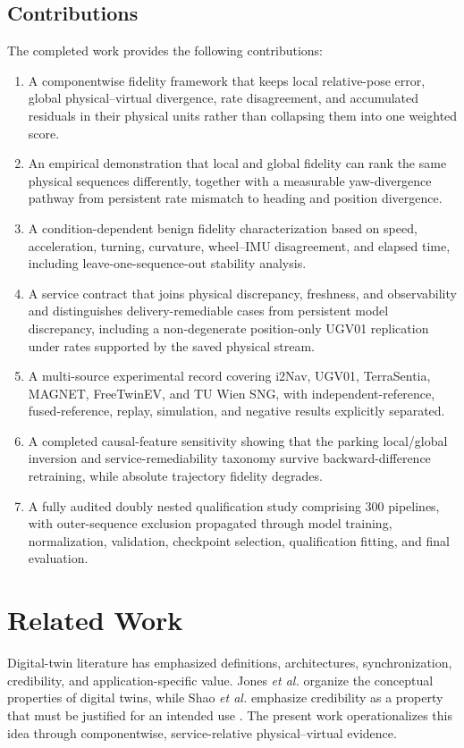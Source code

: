 \documentclass[journal,onecolumn]{IEEEtran}
\begin{document}
\subsection{Contributions}
The completed work provides the following contributions:
\begin{enumerate}
\item A componentwise fidelity framework that keeps local relative-pose error, global physical--virtual divergence, rate disagreement, and accumulated residuals in their physical units rather than collapsing them into one weighted score.
\item An empirical demonstration that local and global fidelity can rank the same physical sequences differently, together with a measurable yaw-divergence pathway from persistent rate mismatch to heading and position divergence.
\item A condition-dependent benign fidelity characterization based on speed, acceleration, turning, curvature, wheel--IMU disagreement, and elapsed time, including leave-one-sequence-out stability analysis.
\item A service contract that joins physical discrepancy, freshness, and observability and distinguishes delivery-remediable cases from persistent model discrepancy, including a non-degenerate position-only UGV01 replication under rates supported by the saved physical stream.
\item A multi-source experimental record covering i2Nav, UGV01, TerraSentia, MAGNET, FreeTwinEV, and TU Wien SNG, with independent-reference, fused-reference, replay, simulation, and negative results explicitly separated.
\item A completed causal-feature sensitivity showing that the parking local/global inversion and service-remediability taxonomy survive backward-difference retraining, while absolute trajectory fidelity degrades.
\item A fully audited doubly nested qualification study comprising 300 pipelines, with outer-sequence exclusion propagated through model training, normalization, validation, checkpoint selection, qualification fitting, and final evaluation.
\end{enumerate}

\section{Related Work}
Digital-twin literature has emphasized definitions, architectures, synchronization, credibility, and application-specific value. Jones \emph{et al.} organize the conceptual properties of digital twins, while Shao \emph{et al.} emphasize credibility as a property that must be justified for an intended use \cite{jones2020,shao2023}. The present work operationalizes this idea through componentwise, service-relative physical--virtual evidence.
\end{document}
